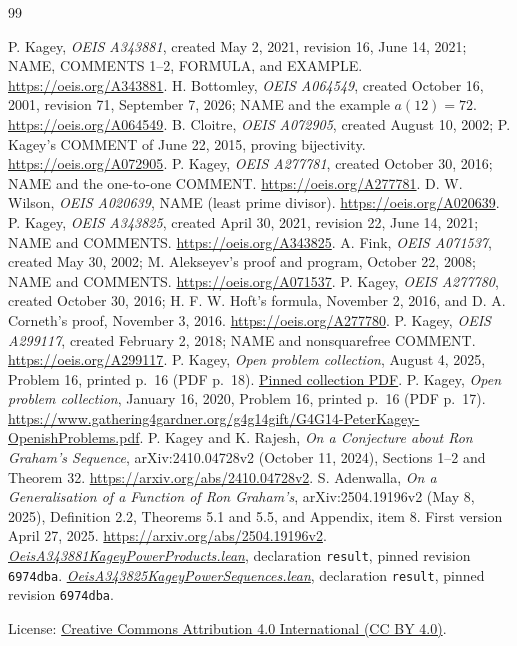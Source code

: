 \documentclass[11pt]{article}
\begin{document}
\begin{thebibliography}{99}\small\raggedright
{} P. Kagey, \emph{OEIS A343881}, created May 2, 2021,
revision 16, June 14, 2021; NAME, COMMENTS 1--2, FORMULA, and EXAMPLE.
\url{https://oeis.org/A343881}.
 H. Bottomley, \emph{OEIS A064549}, created October 16, 2001,
revision 71, September 7, 2026; NAME and the example $a(12)=72$.
\url{https://oeis.org/A064549}.
 B. Cloitre, \emph{OEIS A072905}, created August 10, 2002;
P. Kagey's COMMENT of June 22, 2015, proving bijectivity.
\url{https://oeis.org/A072905}.
 P. Kagey, \emph{OEIS A277781}, created October 30, 2016;
NAME and the one-to-one COMMENT. \url{https://oeis.org/A277781}.
 D. W. Wilson, \emph{OEIS A020639}, NAME (least prime divisor).
\url{https://oeis.org/A020639}.
 P. Kagey, \emph{OEIS A343825}, created April 30, 2021,
revision 22, June 14, 2021; NAME and COMMENTS.
\url{https://oeis.org/A343825}.
 A. Fink, \emph{OEIS A071537}, created May 30, 2002;
M. Alekseyev's proof and program, October 22, 2008; NAME and COMMENTS.
\url{https://oeis.org/A071537}.
 P. Kagey, \emph{OEIS A277780}, created October 30, 2016;
H. F. W. Hoft's formula, November 2, 2016, and D. A. Corneth's proof,
November 3, 2016. \url{https://oeis.org/A277780}.
 P. Kagey, \emph{OEIS A299117}, created February 2, 2018;
NAME and nonsquarefree COMMENT. \url{https://oeis.org/A299117}.
 P. Kagey, \emph{Open problem collection},
August 4, 2025, Problem 16, printed p.~16 (PDF p.~18).
\href{https://github.com/peterkagey/OpenishProblems/blob/4fcae7f356de0ee7f65db45ac07b97d4e1448a64/v2/mainfile.pdf}{Pinned collection PDF}.
 P. Kagey, \emph{Open problem collection},
January 16, 2020, Problem 16, printed p.~16 (PDF p.~17).
\url{https://www.gathering4gardner.org/g4g14gift/G4G14-PeterKagey-OpenishProblems.pdf}.
 P. Kagey and K. Rajesh, \emph{On a Conjecture about
Ron Graham's Sequence}, arXiv:2410.04728v2 (October 11, 2024),
Sections 1--2 and Theorem 32.
\url{https://arxiv.org/abs/2410.04728v2}.
 S. Adenwalla, \emph{On a Generalisation of a Function
of Ron Graham's}, arXiv:2504.19196v2 (May 8, 2025), Definition 2.2,
Theorems 5.1 and 5.5, and Appendix, item 8. First version April 27, 2025.
\url{https://arxiv.org/abs/2504.19196v2}.
\href{https://github.com/the-omega-institute/trureturing/blob/6974dba01daa1a25cc74b87a86c191e95fe2c681/D5/S3/Arith/Factorization/OeisA343881KageyPowerProducts.lean}{\emph{OeisA343881KageyPowerProducts.lean}}, declaration
\texttt{result}, pinned revision \texttt{6974dba}.
\href{https://github.com/the-omega-institute/trureturing/blob/6974dba01daa1a25cc74b87a86c191e95fe2c681/D5/S3/Arith/Factorization/OeisA343825KageyPowerSequences.lean}{\emph{OeisA343825KageyPowerSequences.lean}},
declaration \texttt{result}, pinned revision \texttt{6974dba}.
\end{thebibliography}
\noindent\small
License: \href{https://creativecommons.org/licenses/by/4.0/}{Creative Commons Attribution 4.0 International (CC BY 4.0)}.
\end{document}

